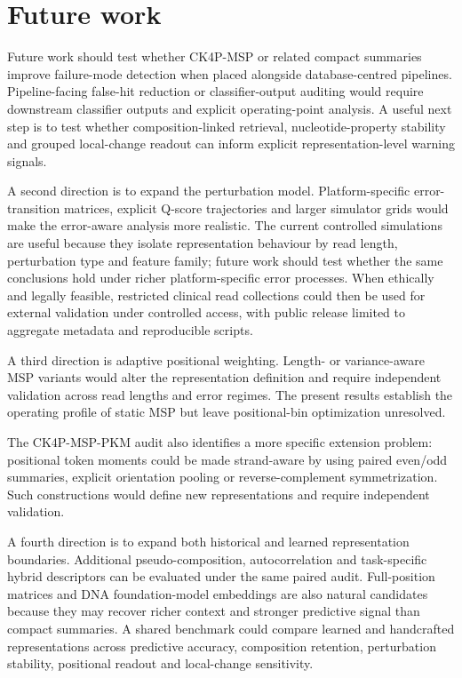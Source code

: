 \FloatBarrier
\section{Future work}

Future work should test whether CK4P-MSP or related compact summaries improve failure-mode detection when placed alongside database-centred pipelines. Pipeline-facing false-hit reduction or classifier-output auditing would require downstream classifier outputs and explicit operating-point analysis. A useful next step is to test whether composition-linked retrieval, nucleotide-property stability and grouped local-change readout can inform explicit representation-level warning signals.

A second direction is to expand the perturbation model. Platform-specific error-transition matrices, explicit Q-score trajectories and larger simulator grids would make the error-aware analysis more realistic. The current controlled simulations are useful because they isolate representation behaviour by read length, perturbation type and feature family; future work should test whether the same conclusions hold under richer platform-specific error processes. When ethically and legally feasible, restricted clinical read collections could then be used for external validation under controlled access, with public release limited to aggregate metadata and reproducible scripts.

A third direction is adaptive positional weighting. Length- or variance-aware MSP variants would alter the representation definition and require independent validation across read lengths and error regimes. The present results establish the operating profile of static MSP but leave positional-bin optimization unresolved.

The CK4P-MSP-PKM audit also identifies a more specific extension problem: positional token moments could be made strand-aware by using paired even/odd summaries, explicit orientation pooling or reverse-complement symmetrization. Such constructions would define new representations and require independent validation.

A fourth direction is to expand both historical and learned representation boundaries. Additional pseudo-composition, autocorrelation and task-specific hybrid descriptors can be evaluated under the same paired audit. Full-position matrices and DNA foundation-model embeddings are also natural candidates because they may recover richer context and stronger predictive signal than compact summaries. A shared benchmark could compare learned and handcrafted representations across predictive accuracy, composition retention, perturbation stability, positional readout and local-change sensitivity.

